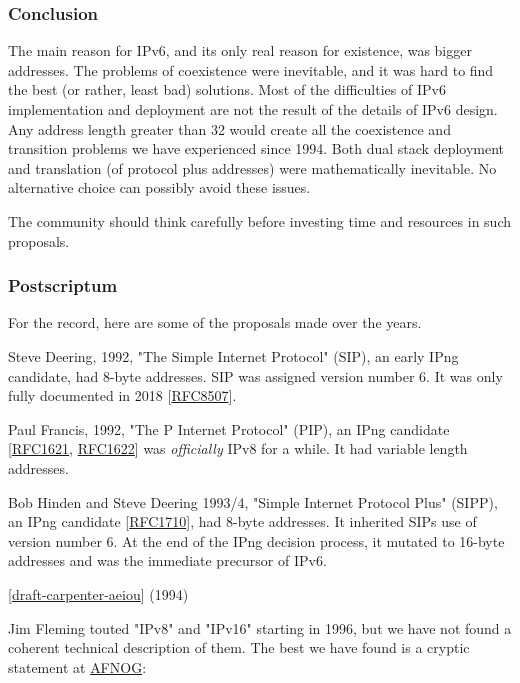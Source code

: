 \documentclass[
]{article}
\begin{document}
\subsubsection{Conclusion}\label{conclusion}

The main reason for IPv6, and its only real reason for existence, was
bigger addresses. The problems of coexistence were inevitable, and it
was hard to find the best (or rather, least bad) solutions. Most of the
difficulties of IPv6 implementation and deployment are not the result of
the details of IPv6 design. Any address length greater than 32 would
create all the coexistence and transition problems we have experienced
since 1994. Both dual stack deployment and translation (of protocol plus
addresses) were mathematically inevitable. No alternative choice can
possibly avoid these issues.

The community should think carefully before investing time and resources
in such proposals.

\subsubsection{Postscriptum}\label{postscriptum}

For the record, here are some of the proposals made over the years.

Steve Deering, 1992, "The Simple Internet Protocol" (SIP), an early IPng
candidate, had 8-byte addresses. SIP was assigned version number 6. It
was only fully documented in 2018
{[}\href{https://www.rfc-editor.org/info/rfc8507}{RFC8507}{]}.

Paul Francis, 1992, "The \textquotesingle P\textquotesingle{} Internet
Protocol" (PIP), an IPng candidate
{[}\href{https://www.rfc-editor.org/info/rfc1621}{RFC1621},
\href{https://www.rfc-editor.org/info/rfc1622}{RFC1622}{]} was
\emph{officially} IPv8 for a while. It had variable length addresses.

Bob Hinden and Steve Deering 1993/4, "Simple Internet Protocol Plus"
(SIPP), an IPng candidate
{[}\href{https://www.rfc-editor.org/info/rfc1710}{RFC1710}{]}, had
8-byte addresses. It inherited SIP\textquotesingle s use of version
number 6. At the end of the IPng decision process, it mutated to 16-byte
addresses and was the immediate precursor of IPv6.

{[}\href{https://datatracker.ietf.org/doc/draft-carpenter-aeiou/}{draft-carpenter-aeiou}{]}
(1994)

Jim Fleming touted "IPv8" and "IPv16" starting in 1996, but we have not
found a coherent technical description of them. The best we have found
is a cryptic statement at
\href{https://afnog.org/archives/archives/msg01304.html}{AFNOG}:
\end{document}
